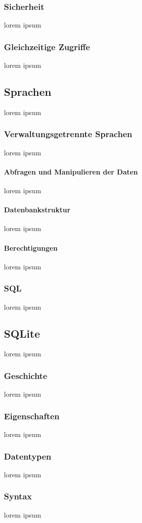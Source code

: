 \documentclass[12pt,a4paper]{report}
\begin{document}
\subsubsection{Sicherheit}
lorem ipsum
\subsubsection{Gleichzeitige Zugriffe}
lorem ipsum 
\subsection{Sprachen}
lorem ipsum
\subsubsection{Verwaltungsgetrennte Sprachen}
lorem ipsum
\paragraph{Abfragen und Manipulieren der Daten}
lorem ipsum
\paragraph{Datenbankstruktur}
lorem ipsum
\paragraph{Berechtigungen}
lorem ipsum
\subsubsection{SQL}
lorem ipsum
\subsection{SQLite}
lorem ipsum
\subsubsection{Geschichte}
lorem ipsum
\subsubsection{Eigenschaften}
lorem ipsum
\subsubsection{Datentypen}
lorem ipsum
\subsubsection{Syntax}
lorem ipsum 
\end{document}
